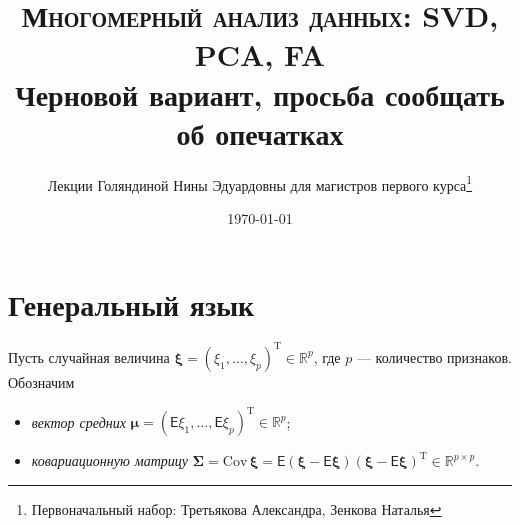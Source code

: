 \documentclass[specialist, 12pt,
subf, %
href, colorlinks=true,
substylefile = spbu.rtx,
]{disser}
\begin{document}
	
	\lstset{
		basicstyle=\ttfamily\footnotesize, %
		numbers=left, %
		numberstyle=\footnotesize, %
		stepnumber=1, %
		numbersep=8pt, %
		language=R}
	
	
	\author{Лекции Голяндиной Нины Эдуардовны для магистров первого курса\thanks{Первоначальный набор: Третьякова Александра, Зенкова Наталья}}
	
	\title{{\normalfont\scshape
	Многомерный анализ данных: SVD, PCA, FA}\\
Черновой вариант, просьба сообщать об опечатках}
	


	
	\date{\today}
	
	
	
	\maketitle
	\tableofcontents
	
	\intro
	\section{Генеральный язык} \label{q2}
Пусть случайная величина $\bm\xi = (\xi_1, \ldots, \xi_p)^{\mathrm{T}} \in \mathbb{R}^p$, где $p$ --- количество признаков. Обозначим
\begin{itemize}
	\item \textit{вектор средних} $\bm\mu = (\textsf{E}\xi_1, \ldots, \textsf{E}\xi_p)^{\mathrm{T}} \in \mathbb{R}^p$;
	\item \textit{ковариационную матрицу} $\bm\Sigma = \mathrm{Cov\,} \bm\xi = \textsf{E}(\bm\xi - \textsf{E} \bm\xi) (\bm\xi - \textsf{E} \bm\xi)^{\mathrm{T}} \in \mathbb{R}^{p \times p}$.
\end{itemize}
\end{document}
